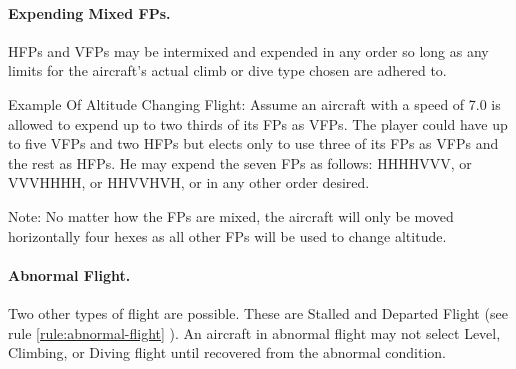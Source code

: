 \paragraph{Expending Mixed FPs.}
HFPs and VFPs may be intermixed and expended in any order so long as any limits for the aircraft's actual climb or dive type chosen are adhered to.

Example Of Altitude Changing Flight: Assume an aircraft with a speed of 7.0 is allowed to expend up to two thirds of its FPs as VFPs. The player could have up to five VFPs and two HFPs but elects only to use three of its FPs as VFPs and the rest as HFPs. He may expend the seven FPs as follows:
HHHHVVV, or VVVHHHH, or HHVVHVH, or in any other order desired.

Note: No matter how the FPs are mixed, the aircraft will only be moved horizontally four hexes as all other FPs will be used to change altitude.


\paragraph{Abnormal Flight.} 
Two other types of flight are possible. These are Stalled and Departed Flight (see rule \ref{rule:abnormal-flight}
).  An aircraft in abnormal flight may not select Level, Climbing, or Diving flight until recovered from the abnormal condition.

